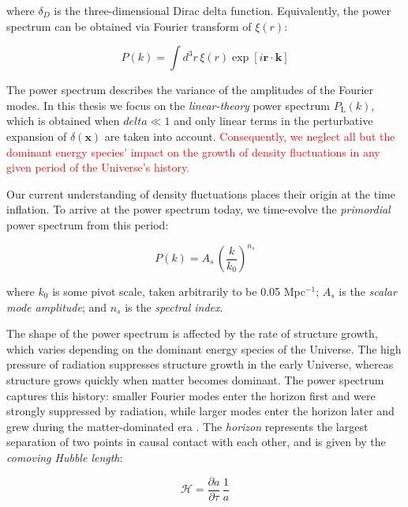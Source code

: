 where $\delta_D$ is the three-dimensional Dirac delta function.
Equivalently, the power spectrum can be obtained
via Fourier transform of $\xi(r)$:

\begin{equation}
P(k) = \int d^3 r \, \xi(r) \exp [i \bm{r} \cdot \bm{k}]
\end{equation}


The power spectrum describes the variance of the amplitudes of the Fourier
modes. In this thesis we focus on the \textit{linear-theory} power spectrum 
$P_\text{L}(k)$, which is obtained when $delta \ll 1$ and only linear terms in 
the perturbative expansion of $\delta(\bm{x})$ are taken into account. 
\textcolor{red}{Consequently, we neglect all but the dominant energy species' 
impact on
the growth of density fluctuations in any given period of the Universe's
history.}

Our current understanding of density fluctuations places their origin at the
time inflation. To arrive at the power spectrum today, we time-evolve the 
\textit{primordial} power spectrum from this period:

\begin{equation}
P(k) = A_s \, \left( \frac{k}{k_0} \right)^{n_s}
\end{equation}

where $k_0$ is some pivot scale, taken arbitrarily to be 0.05 Mpc$^{-1}$;
$A_s$ is the \textit{scalar mode amplitude}; and $n_s$ is the
\textit{spectral index}.

The shape of the power spectrum is affected by the rate of structure growth, 
which varies depending on the dominant energy species of the Universe.
The high pressure of radiation suppresses structure growth in the early
Universe, whereas structure grows quickly when matter becomes dominant.
The power spectrum captures this history: smaller Fourier modes enter the
horizon first and were strongly suppressed by radiation, while larger modes 
enter the horizon later and grew during the matter-dominated era
. The 
\textit{horizon} represents the largest separation of two points in causal 
contact with each other, and is given by the \textit{comoving Hubble length}:

\begin{equation}
\label{eq: horizon}
\mathcal{H}
=
\frac{\partial a}{\partial \tau} \, \frac{1}{a}
\end{equation}

